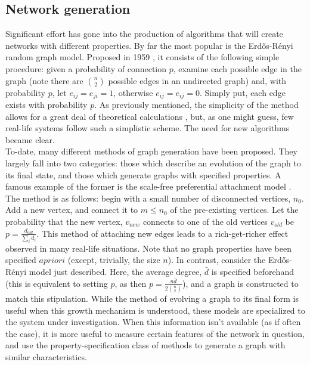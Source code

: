 \documentclass[11pt]{article}
\begin{document}
\subsection{Network generation}
Significant effort has gone into the production of algorithms that will create networks with different properties. By far the most popular is the Erd\H{o}s-R\'{e}nyi random graph model. Proposed in 1959 \cite{originalERpaper}, it consists of the following simple procedure: given a probability of connection $p$, examine each possible edge in the graph (note there are $\binom{n}{2}$ possible edges in an undirected graph) and, with probability $p$, let $e_{ij}=e_{ji}=1$, otherwise $e_{ij}=e_{ij}=0$. Simply put, each edge exists with probability $p$. As previously mentioned, the simplicity of the method allows for a great deal of theoretical calculations \cite{a couple math papers}, but, as one might guess, few real-life systems follow such a simplistic scheme. The need for new algorithms became clear. \vspace{1mm}\\
To-date, many different methods of graph generation have been proposed. They largely fall into two categories: those which describe an evolution of the graph to its final state, and those which generate graphs with specified properties. A famous example of the former is the scale-free preferential attachment model \cite{emergenceOfScalingInRandNet}. The method is as follows: begin with a small number of disconnected vertices, $n_{0}$. Add a new vertex, and connect it to $m\le n_{0}$ of the pre-existing vertices. Let the probability that the new vertex, $v_{new}$ connects to one of the old vertices $v_{old}$ be $p=\frac{d_{old}}{\sum\limits_{i} d_{i}}$. This method of attaching new edges leads to a rich-get-richer effect observed in many real-life situations. Note that no graph properties have been specified $a priori$ (except, trivially, the size $n$). In contrast, consider the Erd\H{o}s-R\'{e}nyi model just described. Here, the average degree, $\bar{d}$ is specified beforehand (this is equivalent to setting $p$, as then $p=\frac{n\bar{d}}{2\binom{n}{2}}$), and a graph is constructed to match this stipulation. While the method of evolving a graph to its final form is useful when this growth mechanism is understood, these models are specialized to the system under investigation. When this information isn't available (as if often the case), it is more useful to measure certain features of the network in question, and use the property-specification class of methods to generate a graph with similar characteristics.\vspace{1mm}\\
\end{document}
